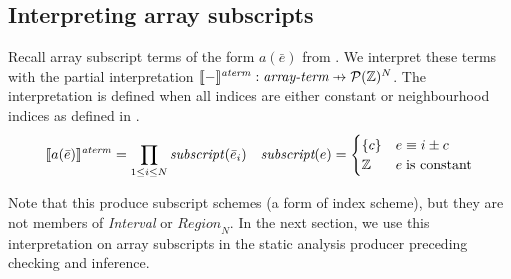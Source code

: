 \subsection{Interpreting array subscripts}
\label{sec:fromcode}

\begin{defn}
  Recall array subscript terms of the form $a(\bar{e})$ from
  . We interpret these terms with the partial
  interpretation $\interp{-}^{\mathit{aterm}} : \textit{array-term}
  \prightarrow{} \mathcal{P}(\bz{})^N$. The interpretation is defined when
  all indices are either constant or neighbourhood indices as defined in
  .
%
  \begin{align*}
    \llbracket{} {a(\bar{e})} \rrbracket{}^{\mathit{aterm}} =
      \prod_{1 \leq i \leq N} \mathit{subscript}(\bar{e}_i) & &
    \textit{subscript}(e) = \begin{cases}
      \{ c \} & e \equiv i \pm c \\
      \textnormal{$\mathbb{Z}$} & e \; \mbox{is constant}
    \end{cases}
  \end{align*}
\end{defn}
%
Note that this produce subscript schemes (a form of index scheme), but
they are not members of \textit{Interval} or $\textit{Region}_N$. In
the next section, we use this interpretation on array subscripts in
the static analysis producer preceding checking and inference.

